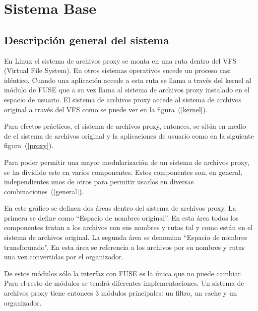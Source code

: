 \chapter{Sistema Base}
\ifpdf
    \graphicspath{{Chapter1/Chapter1Figs/PNG/}{Chapter1/Chapter1Figs/PDF/}{Chapter1/Chapter1Figs/}}
\else
    \graphicspath{{Chapter1/Chapter1Figs/EPS/}{Chapter1/Chapter1Figs/}}
\fi

\section{Descripción general del sistema}

En Linux el sistema de archivos proxy se monta en una ruta dentro del VFS (Virtual File System). En otros sistemas operativos sucede un proceso casi idéntico. Cuando una aplicación accede a esta ruta se llama a través del kernel al módulo de FUSE que a su vez llama al sistema de archivos proxy instalado en el espacio de usuario. El sistema de archivos proxy accede al sistema de archivos original a través del VFS como se puede ver en la figura~(\ref{kernel}).


Para efectos prácticos, el sistema de archivos proxy, entonces, se sitúa en medio de el sistema de archivos original y la aplicaciones de usuario como en la siguiente figura~(\ref{proxy}).


Para poder permitir una mayor modularización de un sistema de archivos proxy, se ha dividido este en varios componentes. Estos componentes son, en general, independientes unos de otros para permitir usarlos en diversas combinaciones~(\ref{general}).


En este gráfico se definen dos áreas dentro del sistema de archivos proxy. La primera se define como ``Espacio de nombres original''. En esta área todos los componentes tratan a los archivos con sus nombres y rutas tal y como están en el sistema de archivos original. La segunda área se denomina ``Espacio de nombres transformado''. En esta área se referencia a los archivos por su nombres y rutas una vez convertidas por el organizador.

De estos módulos sólo la interfaz con FUSE es la única que no puede cambiar. Para el resto de módulos se tendrá diferentes implementaciones. Un sistema de archivos proxy tiene entonces 3 módulos principales: un filtro, un cache y un organizador.


